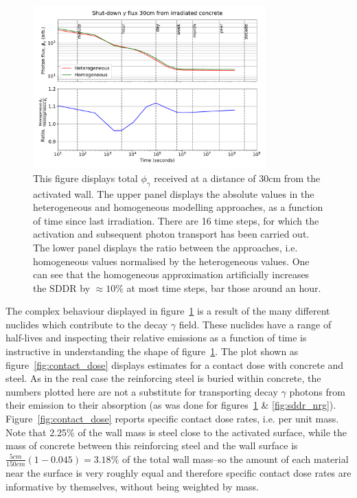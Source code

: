 \begin{figure}[H]
  \centering
  \includegraphics[width=0.8\textwidth]{sddr}
  \caption[Shut-down dose rate as a function of time.]{This figure displays total $\phi_{\gamma}$ received at a distance of 30cm from the activated wall. The upper panel displays the absolute values in the heterogeneous and homogeneous modelling approaches, as a function of time since last irradiation. There are 16 time steps, for which the activation and subsequent photon transport has been carried out. The lower panel displays the ratio between the approaches, i.e. homogeneous values normalised by the heterogeneous values. One can see that the homogeneous approximation artificially increases the SDDR by $\approx 10\%$ at most time steps, bar those around an hour.}
  \label{fig:sddr}
\end{figure}

The complex behaviour displayed in figure~\ref{fig:sddr} is a result of the many different nuclides which contribute to the decay $\gamma$ field. These nuclides have a range of half-lives and inspecting their relative emissions as a function of time is instructive in understanding the shape of figure~\ref{fig:sddr}. The plot shown as figure~\ref{fig:contact_dose} displays estimates for a contact dose with concrete and steel. As in the real case the reinforcing steel is buried within concrete, the numbers plotted here are not a substitute for transporting decay $\gamma$ photons from their emission to their absorption (as was done for figures~\ref{fig:sddr} \& \ref{fig:sddr_nrg}). Figure~\ref{fig:contact_dose} reports specific contact dose rates, i.e. per unit mass. Note that 2.25\% of the wall mass is steel close to the activated surface, while the mass of concrete between this reinforcing steel and the wall surface is $\frac{5cm}{150cm} (1 - 0.045) = 3.18\%$ of the total wall mass--so the amount of each material near the surface is very roughly equal and therefore specific contact dose rates are informative by themselves, without being weighted by mass.


